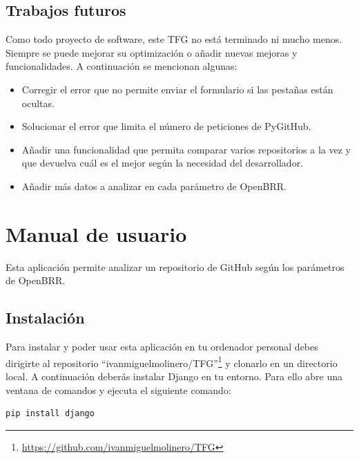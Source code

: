 \documentclass[a4paper, 12pt]{book}
\begin{document}
\section{Trabajos futuros}
\label{sec:trabajos_futuros}

Como todo proyecto de software, este TFG no está terminado ni mucho menos. Siempre se puede mejorar su optimización o añadir nuevas mejoras y funcionalidades. A continuación se mencionan algunas:

\begin{itemize}
	\item Corregir el error que no permite enviar el formulario si las pestañas están ocultas.
	\item Solucionar el error que limita el número de peticiones de PyGitHub.
	\item Añadir una funcionalidad que permita comparar varios repositorios a la vez y que devuelva cuál es el mejor según la necesidad del desarrollador.
	\item Añadir más datos a analizar en cada parámetro de OpenBRR.
\end{itemize}



\cleardoublepage
\appendix
\chapter{Manual de usuario}
\label{app:manual}

Esta aplicación permite analizar un repositorio de GitHub según los parámetros de OpenBRR.

\section{Instalación}

Para instalar y poder usar esta aplicación en tu ordenador personal debes dirigirte al repositorio ``ivanmiguelmolinero/TFG''\footnote{\url{https://github.com/ivanmiguelmolinero/TFG}} y clonarlo en un directorio local. A continuación deberás instalar Django en tu entorno. Para ello abre una ventana de comandos y ejecuta el siguiente comando:

\begin{verbatim}
pip install django
\end{verbatim}
\end{document}
